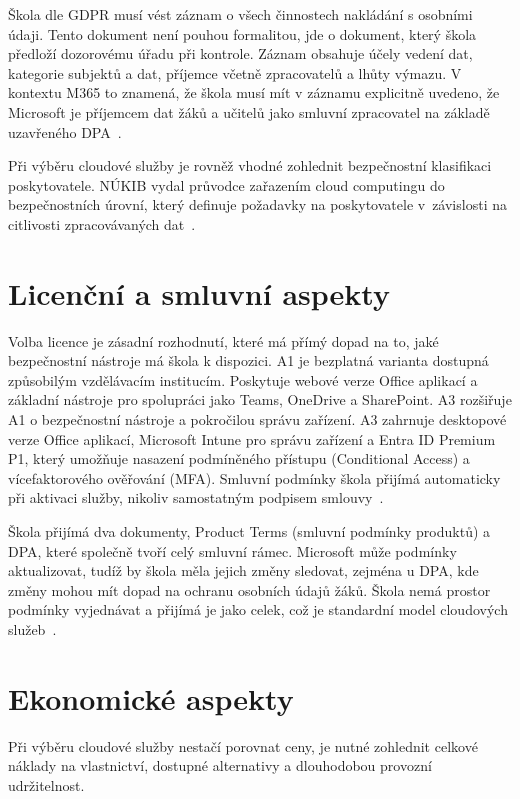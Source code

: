 \documentclass[male,czech,api_bc]{kitheses}
\begin{document}
Škola dle GDPR musí vést záznam o všech činnostech nakládání s osobními údaji. Tento dokument není pouhou formalitou, jde o dokument, který škola předloží dozorovému úřadu při kontrole. Záznam obsahuje účely vedení dat, kategorie subjektů a dat, příjemce včetně zpracovatelů a lhůty výmazu. V kontextu M365 to znamená, že škola musí mít v záznamu explicitně uvedeno, že Microsoft je příjemcem dat žáků a učitelů jako smluvní zpracovatel na základě uzavřeného DPA~\cite{GDPR2016}.

Při výběru cloudové služby je rovněž vhodné zohlednit bezpečnostní 
klasifikaci poskytovatele. NÚKIB vydal průvodce zařazením cloud computingu 
do bezpečnostních úrovní, který definuje požadavky na poskytovatele 
v~závislosti na citlivosti zpracovávaných dat~\cite{NUKIB2023}.

\section{Licenční a smluvní aspekty}
Volba licence je zásadní rozhodnutí, které má přímý dopad na to, jaké bezpečnostní nástroje má škola k dispozici. A1 je bezplatná varianta dostupná způsobilým vzdělávacím institucím. Poskytuje webové verze Office aplikací a základní nástroje pro spolupráci jako Teams, OneDrive a SharePoint. A3 rozšiřuje A1 o bezpečnostní nástroje a pokročilou správu zařízení. A3 zahrnuje desktopové verze Office aplikací, Microsoft Intune pro správu zařízení a Entra ID Premium P1, který umožňuje nasazení podmíněného přístupu (Conditional Access) a vícefaktorového ověřování (MFA). Smluvní podmínky škola přijímá automaticky při aktivaci služby, nikoliv samostatným podpisem smlouvy~\cite{MicrosoftM365Edu2025}.

Škola přijímá dva dokumenty, Product Terms (smluvní podmínky produktů) a DPA, které společně tvoří celý smluvní rámec. Microsoft může podmínky aktualizovat, tudíž by škola měla jejich změny sledovat, zejména u DPA, kde změny mohou mít dopad na ochranu osobních údajů žáků. Škola nemá prostor podmínky vyjednávat a přijímá je jako celek, což je standardní model cloudových služeb~\cite{MicrosoftDPA2025}.

\section{Ekonomické aspekty}
Při výběru cloudové služby nestačí porovnat ceny, je nutné zohlednit celkové náklady na vlastnictví, dostupné alternativy a dlouhodobou provozní udržitelnost.
\end{document}
